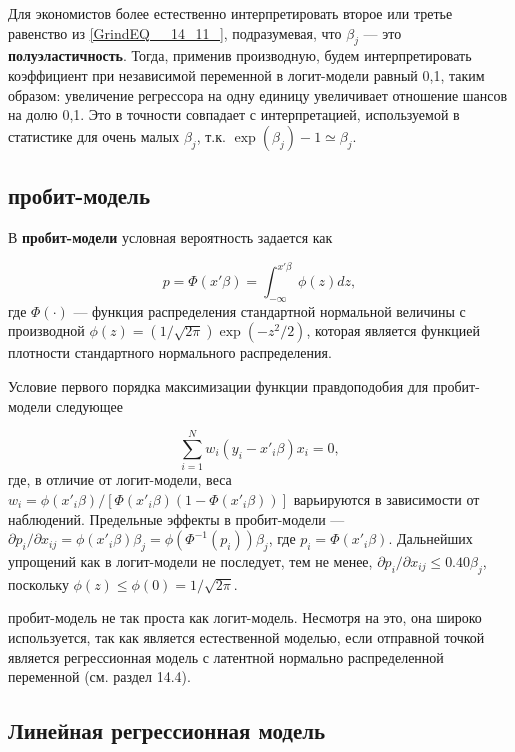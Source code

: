 Для экономистов более естественно интерпретировать второе или третье равенство из \eqref{GrindEQ__14_11_},  подразумевая,  что $\beta_j$ --- это \textbf{полуэластичность}. Тогда,  применив производную,  будем интерпретировать коэффициент при независимой переменной в логит-модели  равный 0,1,  таким образом:  увеличение регрессора на одну единицу увеличивает отношение шансов на долю 0,1. Это в точности совпадает с интерпретацией,  используемой в статистике для очень малых $\beta_j$, т.к. $\exp (\beta_j)-1 \simeq \beta_j$.

\subsection{пробит-модель}

В \textbf{пробит-модели} условная вероятность задается как 

\begin{equation} 
\label{GrindEQ__14_12_} 
p=\Phi (x'\beta) =\int^{x'\beta}_{-\infty} \phi(z)dz,
\end{equation} 
где $\Phi (\cdot)$ --- функция распределения стандартной нормальной величины с производной $\phi (z)=(1/\sqrt{2\pi})\exp (-z^2/2)$, которая является функцией плотности стандартного нормального распределения.

Условие первого порядка максимизации функции правдоподобия для пробит-модели следующее 

\[
\sum^N_{i=1} w_i (y_i-x'_i\beta)x_i=0, 
\] 
где, в отличие от логит-модели,  веса $w_i=\phi (x'_i\beta)/[\Phi (x'_i\beta)(1-\Phi (x'_i\beta))]$ варьируются в зависимости от наблюдений. Предельные эффекты в пробит-модели --- $\partial p_i/ \partial x_{ij}=\phi (x'_i\beta)\beta_j=\phi (\Phi^{-1}(p_i))\beta_j$, где $p_i=\Phi (x'_i\beta)$. 
Дальнейших упрощений как в логит-модели не последует, тем не менее, $\partial p_i/ \partial x_{ij} \le 0.40\beta_j$, поскольку $\phi(z) \le \phi (0)=1/\sqrt{2\pi}$. %

пробит-модель не так проста как логит-модель. Несмотря на это,  она широко используется,  так как является естественной моделью,  если отправной точкой является  регрессионная модель с латентной нормально распределенной переменной (см. раздел 14.4).

\subsection{Линейная регрессионная модель}

